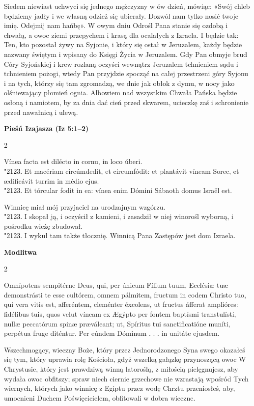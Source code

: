 \documentclass[10pt,a5paper]{book}
\newcommand{\kol}{black}
\newcommand{\textjuni}[1]{{\fontspec{Junicode-Regular}#1}}
\newcommand{\vv}{\textcolor{\kol}{\textjuni{\char"2123. }}}
\newcommand{\oremus}[3]{\medskip\centerline{\textbf{#1}}\medskip
	\begin{sloppypar}
		\begin{paracol}{2}
			\setlength{\columnsep}{0em}
			\begin{leftcolumn}
				#2
			\end{leftcolumn}
			\begin{rightcolumn}
				#3
			\end{rightcolumn}
		\end{paracol}
	\end{sloppypar}}
\begin{document}
				Siedem niewiast uchwyci się jednego mężczyzny w ów dzień, mówiąc: «Swój chleb będziemy jadły i we własną odzież się ubierały. Dozwól nam tylko nosić twoje imię. Odejmij nam hańbę». 
				W owym dniu Odrośl Pana stanie się ozdobą i chwałą, a owoc ziemi przepychem i krasą dla ocalałych z Izraela. I będzie tak: Ten, kto pozostał żywy na Syjonie, i który się ostał w Jeruzalem, każdy będzie nazwany świętym i wpisany do Księgi Życia w Jeruzalem.
				Gdy Pan obmyje brud Córy Syjońskiej i krew rozlaną oczyści wewnątrz Jeruzalem tchnieniem sądu i tchnieniem pożogi, wtedy Pan przyjdzie spocząć na całej przestrzeni góry Syjonu i na tych, którzy się tam zgromadzą, we dnie jak obłok z dymu, w nocy jako olśniewający płomień ognia. Albowiem nad wszystkim Chwała Pańska będzie osłoną i namiotem, by za dnia dać cień przed skwarem, ucieczkę zaś i schronienie przed nawałnicą i ulewą.
				
				\oremus{Pieśń Izajasza (Iz 5:1--2)}{
					Vínea facta est dilécto in cornu, in loco úberi.\\
					\vv Et macériam circúmdedit, et circumfódit: et plantávit víneam Sorec, et ædificávit turrim in médio ejus.\\
					\vv Et tórcular fodit in ea: vínea enim Dómini Sábaoth domus Israël est.}{
					Winnicę miał mój przyjaciel na urodzajnym wzgórzu.\\
					\vv I skopał ją, i oczyścił z kamieni, i zasadził w niej winorośl wyborną, i pośrodku wieżę zbudował.\\
					\vv I wykuł tam także tłocznię. Winnicą Pana Zastępów jest dom Izraela.}
				
				\oremus{Modlitwa}{
				Omnípotens sempitérne Deus, qui, per únicum Fílium tuum, Ecclésiæ tuæ demonstrásti te esse cultórem, omnem pálmitem, fructum in eodem Christo tuo, qui vera vitis est, afferéntem, cleménter éxcolens, ut fructus áfferat amplióres: fidélibus tuis, quos velut víneam ex Ægýpto per fontem baptísmi transtulísti, nullæ peccatórum spinæ præváleant; ut, Spíritus tui sanctificatióne muníti, perpétua fruge diténtur. Per eúndem Dóminum . . . in unitáte ejusdem.}{
				Wszechmogący, wieczny Boże, który przez Jednorodzonego Syna swego okazałeś się tym, który uprawia rolę Kościoła, gdyż wszelką gałązkę przynoszącą owoc W Chrystusie, który jest prawdziwą winną latoroślą, z miłością pielęgnujesz, aby wydała owoc obfitszy; spraw niech ciernie grzechowe nie wzrastają wpośród Tych wiernych, których jako winnicę z Egiptu przez wodę Chrztu przeniosłeś, aby, umocnieni Duchem Poświęcicielem, obfitowali w dobra wieczne.}
			
\end{document}
